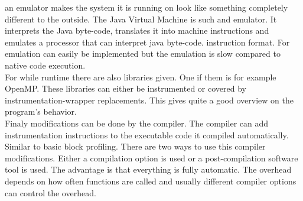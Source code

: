             an emulator makes the system it is running on look like something
            completely different to the outside. The Java Virtual Machine is
            such and emulator. It interprets the Java byte-code, translates it
            into machine instructions and emulates a processor that can 
            interpret java byte-code. instruction format. For emulation 
             can easily be implemented but the
            emulation is slow compared to native code execution. \\
            For  while runtime there are also 
            libraries given. One if them is for example OpenMP. These libraries
            can either be instrumented or covered by instrumentation-wrapper
            replacements. This gives quite a good overview on the program's
            behavior. \\
            Finaly modifications can be done by the compiler. The compiler can
            add instrumentation instructions to the executable code it compiled
            automatically. Similar to basic block profiling. There are two ways
            to use this compiler modifications. Either a compilation option is
            used or a post-compilation software tool is used. The advantage is
            that everything is fully automatic. The overhead depends on how
            often functions are called and usually different compiler options
            can control the overhead.
            
